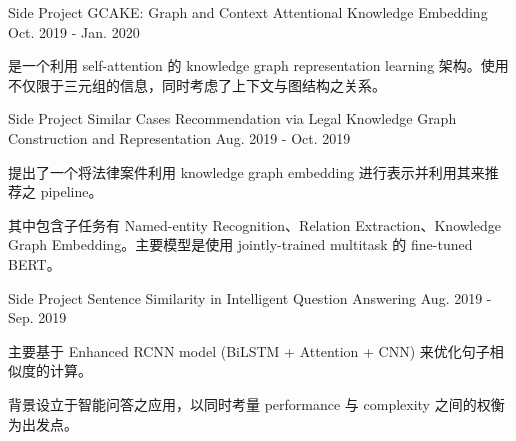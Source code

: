 

\begin{cventries}

  \cventry
    {Side Project} %
    {GCAKE: Graph and Context Attentional Knowledge Embedding} %
    {} %
    {Oct. 2019 - Jan. 2020} %
    {
      \begin{cvitems} %
        \item {是一个利用 self-attention 的 knowledge graph representation learning 架构。使用不仅限于三元组的信息，同时考虑了上下文与图结构之关系。}
      \end{cvitems}
    }

  \cventry
    {Side Project} %
    {Similar Cases Recommendation via Legal Knowledge Graph Construction and Representation} %
    {} %
    {Aug. 2019 - Oct. 2019} %
    {
      \begin{cvitems} %
        \item {提出了一个将法律案件利用 knowledge graph embedding 进行表示并利用其来推荐之 pipeline。}
        \item {其中包含子任务有 Named-entity Recognition、Relation Extraction、Knowledge Graph Embedding。主要模型是使用 jointly-trained multitask 的 fine-tuned BERT。}
      \end{cvitems}
    }

  \cventry
    {Side Project} %
    {Sentence Similarity in Intelligent Question Answering} %
    {} %
    {Aug. 2019 - Sep. 2019} %
    {
      \begin{cvitems} %
        \item {主要基于 Enhanced RCNN model (BiLSTM + Attention + CNN) 来优化句子相似度的计算。}
        \item {背景设立于智能问答之应用，以同时考量 performance 与 complexity 之间的权衡为出发点。}
      \end{cvitems}
    }


\end{cventries}
